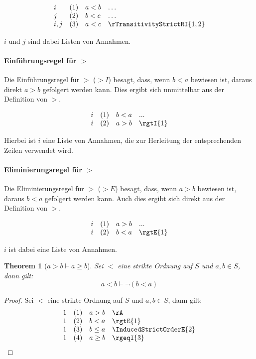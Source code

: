 \documentclass{book}
\theoremstyle{plain}
\newtheorem{theorem}{Theorem}
\theoremstyle{remark}
\theoremstyle{definition}
\begin{document}
\[
\begin{array}{llll}
    i           & (1) & a < b & \dots \\
    j           & (2) & b < c & \dots \\
    i,j         & (3) & a < c & \rTransitivityStrictRI{1,2}
\end{array}
\]

\(i\) und \(j\) sind dabei Listen von Annahmen.

\paragraph{Einführungsregel für \(>\)}
\label{rule:rgtI}
Die Einführungsregel für \(>\) (\(> I\)) besagt, dass, wenn \(b < a\) bewiesen ist, daraus direkt \(a > b\) gefolgert werden kann. Dies ergibt sich unmittelbar aus der Definition von \(>\).

\[
\begin{array}{llll}
    i & (1) & b < a & \text{...} \\
    i & (2) & a > b & \rgtI{1} \\
\end{array}
\]

Hierbei ist \(i\) eine Liste von Annahmen, die zur Herleitung der entsprechenden Zeilen verwendet wird.

\paragraph{Eliminierungsregel für \(>\)}
\label{rule:rgtE}
Die Eliminierungsregel für \(>\) (\(> E\)) besagt, dass, wenn \(a > b\) bewiesen ist, daraus \(b < a\) gefolgert werden kann. Auch dies ergibt sich direkt aus der Definition von \(>\).

\[
\begin{array}{llll}
    i & (1) & a > b & \text{...} \\
    i & (2) & b < a & \rgtE{1} \\
\end{array}
\]

\(i\) ist dabei eine Liste von Annahmen.

\label{aGneqbImpaGeqb}
\begin{theorem}[\(a > b\vdash a\geq b\)]
Sei \(<\) eine strikte Ordnung auf \(S\) und \(a,b\in  S\), dann gilt:
\[a<b\vdash \neg(b<a)\]
\end{theorem}
\begin{proof}
    Sei \(<\) eine strikte Ordnung auf \(S\) und \(a,b\in  S\), dann gilt:
	\[
	\begin{array}{llll}
		1   & (1) & a > b & \rA\\
            1   & (2) & b<a & \rgtE{1}\\
		1   & (3) & b\leq a & \InducedStrictOrderE{2}\\
            1   & (4) & a\geq b & \rgeqI{3}\\
	\end{array}
	\]
\end{proof}
\end{document}
